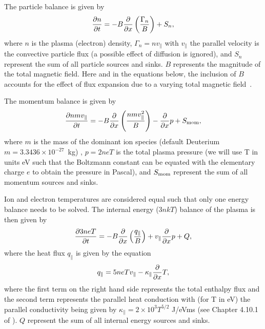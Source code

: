 \documentclass[amsmath,amssymb,a4]{revtex4}
\begin{document}
\noindent The particle balance is given by
\begin{equation}\label{particle_balance}
    {\partial n \over \partial t} = - B{\partial \over \partial x} \left({\Gamma_n \over B}\right) + S_n,
\end{equation}
where $n$ is the plasma (electron) density, $\Gamma_n = n v_\parallel$ with $v_\parallel$ the parallel velocity is the convective particle flux (a possible effect of diffusion is ignored), and $S_n$ represent the sum of all particle sources and sinks. $B$ represents the magnitude of the total magnetic field. Here and in the equations below, the inclusion of $B$ accounts for the effect of flux expansion due to a varying total magnetic field~\cite{dudson2019,havlickova2013}.

\noindent The momentum balance is given by
\begin{equation}\label{momentum_balance}
    {\partial n m v_\parallel \over \partial t} = - B{\partial \over \partial x} \left({n m v_\parallel^2 \over B}\right) - {\partial \over \partial x} p + S_{\rm mom},
\end{equation}
where $m$ is the mass of the dominant ion species (default Deuterium $m = 3.3436 \times 10^{-27}$~kg) , $p = 2 n e T$ is the total plasma pressure (we will use T in units eV such that the Boltzmann constant can be equated with the elementary charge $e$ to obtain the pressure in Pascal), and $S_{\rm mom}$ represent the sum of all momentum sources and sinks.

\noindent Ion and electron temperatures are considered equal such that only one energy balance needs to be solved. The internal energy ($3 n k T$) balance of the plasma is then given by
\begin{equation}\label{energy_balance}
    {\partial 3 n e T \over \partial t} = - B{\partial \over \partial x} \left({q_\parallel \over B}\right) + v_\parallel {\partial \over \partial x} p + Q,
\end{equation}
where the heat flux $q_\parallel$ is given by the equation
\begin{equation}\label{heat_flux}
    q_\parallel = 5 n e T v_\parallel - \kappa_\parallel {\partial \over \partial x} T,
\end{equation}
where the first term on the right hand side represents the total enthalpy flux and the second term represents the parallel heat conduction with (for T in eV) the parallel conductivity being given by $\kappa_\parallel = 2 \times 10^3 T^{5/2}$ J/eVms (see Chapter 4.10.1 of \cite{stangeby}). $Q$ represent the sum of all internal energy sources and sinks.
\end{document}
